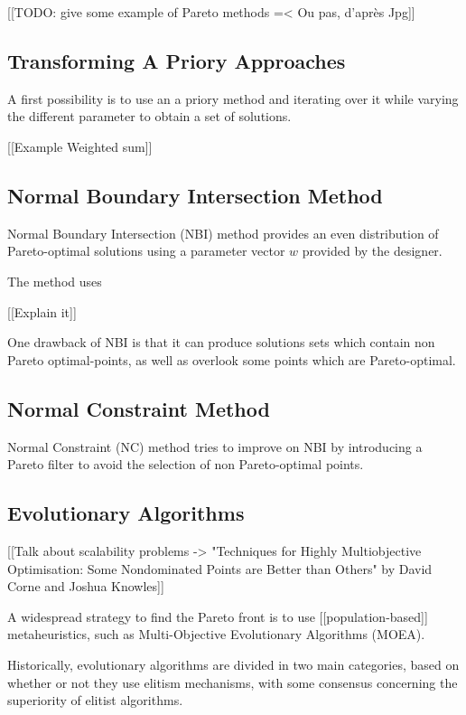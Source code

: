 [[TODO: give some example of Pareto methods =< Ou pas, d'après Jpg]]

\subsection{Transforming A Priory Approaches}

A first possibility is to use an a priory method and iterating over it while varying the different parameter to obtain a set of solutions.

[[Example Weighted sum]]

\subsection{Normal Boundary Intersection Method}

Normal Boundary Intersection (NBI)\cite{S1052623496307510} method provides an even distribution of Pareto-optimal solutions using a parameter vector $w$ provided by the designer.

The method uses

[[Explain it]]

One drawback of NBI is that it can produce solutions sets which contain non Pareto optimal-points, as well as overlook some points which are Pareto-optimal.

\subsection{Normal Constraint Method}

Normal Constraint (NC) method tries to improve on NBI by introducing a Pareto filter to avoid the selection of non Pareto-optimal points.

\subsection{Evolutionary Algorithms}

[[Talk about scalability problems -> "Techniques for Highly Multiobjective Optimisation: Some Nondominated Points are Better than Others" by David Corne and Joshua Knowles]]


A widespread strategy to find the Pareto front is to use [[population-based]] metaheuristics, such as Multi-Objective Evolutionary Algorithms (MOEA). 

Historically, evolutionary algorithms are divided in two main categories, based on whether or not they use elitism mechanisms, with some consensus concerning the superiority of elitist algorithms.

